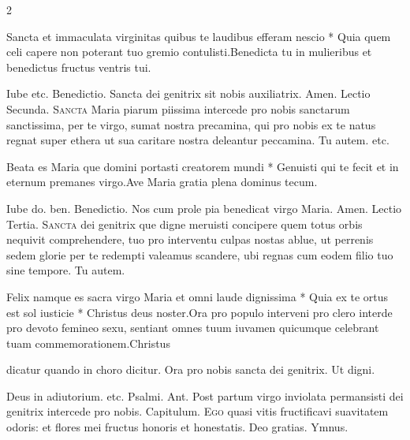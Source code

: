 \begin{multicols*}{2}
\begin{responsory}
{Sancta et immaculata virginitas quibus te laudibus efferam nescio * Quia quem celi capere non poterant tuo gremio contulisti.}{Benedicta tu in mulieribus et benedictus fructus ventris tui.}
\end{responsory}%
Iube etc. {\color{Red} Benedictio.} Sancta dei genitrix sit nobis auxiliatrix. Amen. {\color{Red} Lectio Secunda.}
\lettrine[lines=2]{\zallmancaps \color{Red} S}{ancta} Maria piarum piissima intercede pro nobis sanctarum sanctissima, per te virgo, sumat nostra precamina, qui pro nobis ex te natus regnat super ethera ut sua caritare nostra deleantur peccamina. Tu autem. etc.
\begin{responsory}[beata-es]
{Beata es Maria que domini portasti creatorem mundi * Genuisti qui te fecit et in eternum premanes virgo.}{Ave Maria gratia plena dominus tecum.}
\end{responsory}%
Iube do. ben. {\color{Red} Benedictio.} Nos cum prole pia benedicat virgo Maria. Amen. {\color{Red} Lectio Tertia.}
\lettrine[lines=2]{\zallmancaps \color{Blue} S}{ancta} dei genitrix que digne meruisti concipere quem totus orbis nequivit comprehendere, tuo pro interventu culpas nostas ablue, ut perrenis sedem glorie per te redempti valeamus scandere, ubi regnas cum eodem filio tuo sine tempore. Tu autem.
\begin{responsory-final}
{Felix namque es sacra virgo Maria et omni laude dignissima * Quia ex te ortus est sol iusticie * Christus deus noster.}{Ora pro populo interveni pro clero interde pro devoto femineo sexu, sentiant omnes tuum iuvamen quicumque celebrant tuam commemorationem.}{Christus}
\end{responsory-final}%
 {\color{Red} dicatur quando in choro dicitur.} \V Ora pro nobis sancta dei genitrix. \R Ut digni.
{\color{Red} }
\par \noindent Deus in adiutorium. etc. {\color{Red} Psalmi.}
{\color{Red} Ant.} Post partum virgo inviolata permansisti dei genitrix intercede pro nobis. {\color{Red} Capitulum.}
\lettrine[lines=2]{\zallmancaps \color{Red} E}{go} quasi vitis fructificavi suavitatem odoris: et flores mei fructus honoris et honestatis. Deo gratias. {\color{Red} Ymnus.}
\end{multicols*}
